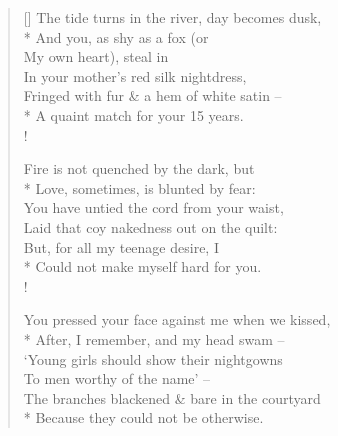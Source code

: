 \settowidth{\versewidth}{The tide turns in the river, day becomes dusk,}
\begin{verse}[\versewidth]
The tide turns in the river, day becomes dusk,\\*
\vin And you, as shy as a fox (or\\
My own heart), steal in\\
\vin In your mother's red silk nightdress,\\
Fringed with fur \& a hem of white satin --\\*
\vin A quaint match for your 15 years.\\!

Fire is not quenched by the dark, but\\*
\vin Love, sometimes, is blunted by fear:\\
You have untied the cord from your waist,\\
\vin Laid that coy nakedness out on the quilt:\\
But, for all my teenage desire, I\\*
\vin Could not make myself hard for you.\\!

You pressed your face against me when we kissed,\\*
\vin After, I remember, and my head swam --\\
`Young girls should show their nightgowns\\
\vin To men worthy of the name' --\\
The branches blackened \& bare in the courtyard\\*
\vin Because they could not be otherwise.
\end{verse}
